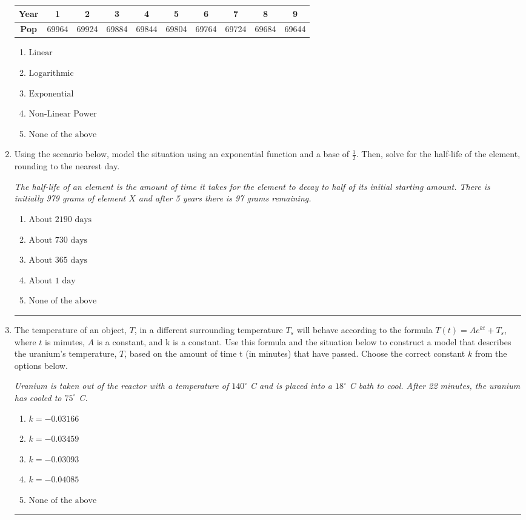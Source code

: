 \documentclass[14pt]{extbook}
\newcommand{\litem}[1]{\item#1\hspace*{-1cm}\rule{\textwidth}{0.4pt}}
\begin{document}
\begin{enumerate}
{\begin{tabular}{c|c|c|c|c|c|c|c|c|c}
\textbf{Year} &1 &2 &3 &4 &5 &6 &7 &8 &9\tabularnewline \hline
\textbf{Pop} &69964 &69924 &69884 &69844 &69804 &69764 &69724 &69684 &69644\end{tabular}\begin{enumerate}[label=\Alph*.]
\item \( \text{Linear} \)
\item \( \text{Logarithmic} \)
\item \( \text{Exponential} \)
\item \( \text{Non-Linear Power} \)
\item \( \text{None of the above} \)

\end{enumerate} }
\litem{
Using the scenario below, model the situation using an exponential function and a base of $\frac{1}{2}$. Then, solve for the half-life of the element, rounding to the nearest day.
\begin{center}
    \textit{ The half-life of an element is the amount of time it takes for the element to decay to half of its initial starting amount. There is initially 979 grams of element $X$ and after 5 years there is 97 grams remaining. }
\end{center}
\begin{enumerate}[label=\Alph*.]
\item \( \text{About } 2190 \text{ days} \)
\item \( \text{About } 730 \text{ days} \)
\item \( \text{About } 365 \text{ days} \)
\item \( \text{About } 1 \text{ day} \)
\item \( \text{None of the above} \)

\end{enumerate} }
\litem{
The temperature of an object, $T$, in a different surrounding temperature $T_s$ will behave according to the formula $T(t) = Ae^{kt} + T_s$, where $t$ is minutes, $A$ is a constant, and k is a constant. Use this formula and the situation below to construct a model that describes the uranium's temperature, $T$, based on the amount of time t (in minutes) that have passed. Choose the correct constant $k$ from the options below.
\begin{center}
    \textit{ Uranium is taken out of the reactor with a temperature of $140^{\circ}$ C and is placed into a $18^{\circ}$ C bath to cool. After 22 minutes, the uranium has cooled to $75^{\circ}$ C. }
\end{center}
\begin{enumerate}[label=\Alph*.]
\item \( k = -0.03166 \)
\item \( k = -0.03459 \)
\item \( k = -0.03093 \)
\item \( k = -0.04085 \)
\item \( \text{None of the above} \)


\end{enumerate}}
\end{enumerate}
\end{document}
